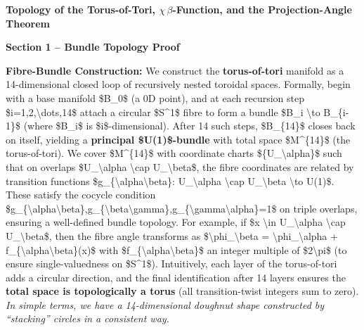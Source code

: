 \documentclass[]{article}
\date{}
\begin{document}
\textbf{Topology of the Torus-of-Tori, $\chi\,$$\beta$-Function, and the Projection-Angle Theorem}

\textbf{Section 1 -- Bundle Topology Proof}

\textbf{Fibre-Bundle Construction:} We construct the
\textbf{torus‑of‑tori} manifold as a 14-dimensional closed loop of
recursively nested toroidal spaces. Formally, begin with a base manifold
\$B\_0\$ (a 0D point), and at each recursion step
\$i=1,2,\textbackslash{}dots,14\$ attach a circular \$S\^{}1\$ fibre to
form a bundle \$B\_i \textbackslash{}to B\_\{i-1\}\$ (where \$B\_i\$ is
\$i\$-dimensional). After 14 such steps, \$B\_\{14\}\$ closes back on
itself, yielding a \textbf{principal \$U(1)\$-bundle} with total space
\$M\^{}\{14\}\$ (the torus-of-tori). We cover \$M\^{}\{14\}\$ with
coordinate charts \$\{U\_\textbackslash{}alpha\}\$ such that on overlaps
\$U\_\textbackslash{}alpha \textbackslash{}cap
U\_\textbackslash{}beta\$, the fibre coordinates are related by
transition functions \$g\_\{\textbackslash{}alpha\textbackslash{}beta\}:
U\_\textbackslash{}alpha \textbackslash{}cap U\_\textbackslash{}beta
\textbackslash{}to U(1)\$. These satisfy the cocycle condition
\$g\_\{\textbackslash{}alpha\textbackslash{}beta\},g\_\{\textbackslash{}beta\textbackslash{}gamma\},g\_\{\textbackslash{}gamma\textbackslash{}alpha\}=1\$
on triple overlaps, ensuring a well-defined bundle topology. For
example, if \$x \textbackslash{}in U\_\textbackslash{}alpha
\textbackslash{}cap U\_\textbackslash{}beta\$, then the fibre angle
transforms as \$\textbackslash{}phi\_\textbackslash{}beta =
\textbackslash{}phi\_\textbackslash{}alpha +
f\_\{\textbackslash{}alpha\textbackslash{}beta\}(x)\$ with
\$f\_\{\textbackslash{}alpha\textbackslash{}beta\}\$ an integer multiple
of \$2\textbackslash{}pi\$ (to ensure single-valuedness on \$S\^{}1\$).
Intuitively, each layer of the torus-of-tori adds a circular direction,
and the final identification after 14 layers ensures the \textbf{total
space is topologically a torus} (all transition-twist integers sum to
zero). \emph{In simple terms, we have a 14-dimensional doughnut shape
constructed by ``stacking'' circles in a consistent way.}
\end{document}
